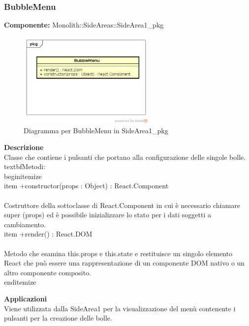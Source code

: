\clearpage

\subsubsection{BubbleMenu}
\textbf{Componente:}  Monolith::SideAreas::SideArea1\_pkg\\
   \FloatBarrier
   \begin{figure}[ht]
   \centering
   \includegraphics[width=0.6\textwidth]{img/single-BubbleMenu}
   \caption{{Diagramma per BubbleMenu in SideArea1\_pkg}}
\end{figure}
\FloatBarrier
\textbf{Descrizione}\\
Classe che contiene i pulsanti che portano alla configurazione delle singole bolle.
\\textbf{Metodi:} 
\\begin{itemize}
\\item +constructor(props : Object) : React.Component 
\\\\
Costruttore della sottoclasse di React.Component in cui è necessario chiamare super (props) ed è possibile inizializzare lo stato per i dati soggetti a cambiamento.
\\item +render() : React.DOM 
\\\\
Metodo che esamina this.props e this.state e restituisce un singolo elemento React che può essere una rappresentazione di un componente DOM nativo o un altro componente composito.
\\end{itemize} 


\textbf{Applicazioni}\\
Viene utilizzata dalla SideArea1 per la visualizzazione del menù contenente i pulsanti per la creazione delle bolle. 


\clearpage

